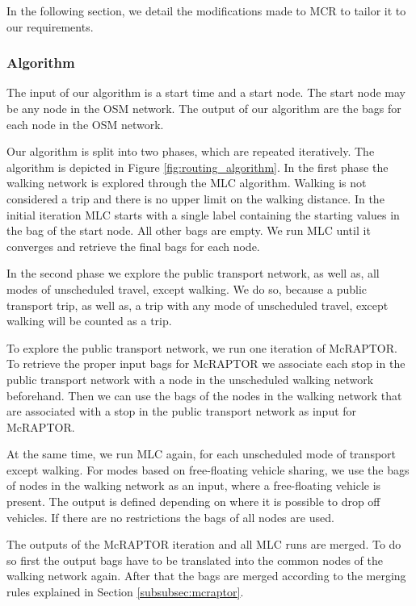 In the following section, we detail the modifications made to MCR to tailor it to our requirements.

\subsubsection{Algorithm}
\label{subsubsec:algorithm}

The input of our algorithm is a start time and a start node.
The start node may be any node in the OSM network.
The output of our algorithm are the bags for each node in the OSM network.

Our algorithm is split into two phases, which are repeated iteratively.
The algorithm is depicted in Figure \ref{fig:routing_algorithm}.
In the first phase the walking network is explored through the MLC algorithm.
Walking is not considered a trip and there is no upper limit on the walking distance.
In the initial iteration MLC starts with a single label containing the starting values in the bag of the start node.
All other bags are empty.
We run MLC until it converges and retrieve the final bags for each node.

In the second phase we explore the public transport network, as well as, all modes of unscheduled travel, except walking.
We do so, because a public transport trip, as well as, a trip with any mode of unscheduled travel, except walking will be counted as a trip.

To explore the public transport network, we run one iteration of McRAPTOR.
To retrieve the proper input bags for McRAPTOR we associate each stop in the public transport network with a node in the unscheduled walking network beforehand.
Then we can use the bags of the nodes in the walking network that are associated with a stop in the public transport network as input for McRAPTOR.

At the same time, we run MLC again, for each unscheduled mode of transport except walking.
For modes based on free-floating vehicle sharing, we use the bags of nodes in the walking network as an input, where a free-floating vehicle is present.
The output is defined depending on where it is possible to drop off vehicles.
If there are no restrictions the bags of all nodes are used.

The outputs of the McRAPTOR iteration and all MLC runs are merged.
To do so first the output bags have to be translated into the common nodes of the walking network again.
After that the bags are merged according to the merging rules explained in Section \ref{subsubsec:mcraptor}.

